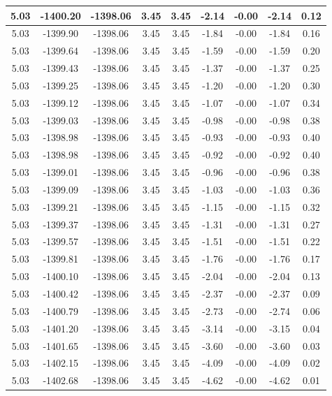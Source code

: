 \begin{table}[htbp]
\begin{adjustbox}{angle=90}
\begin{tabular}{|c|c|c|c|c|c|c|c|c|}
 5.03 & -1400.20 & -1398.06 & 3.45 & 3.45 & -2.14 & -0.00 & -2.14 & 0.12\\ \hline
 5.03 & -1399.90 & -1398.06 & 3.45 & 3.45 & -1.84 & -0.00 & -1.84 & 0.16\\ \hline
 5.03 & -1399.64 & -1398.06 & 3.45 & 3.45 & -1.59 & -0.00 & -1.59 & 0.20\\ \hline
 5.03 & -1399.43 & -1398.06 & 3.45 & 3.45 & -1.37 & -0.00 & -1.37 & 0.25\\ \hline
 5.03 & -1399.25 & -1398.06 & 3.45 & 3.45 & -1.20 & -0.00 & -1.20 & 0.30\\ \hline
 5.03 & -1399.12 & -1398.06 & 3.45 & 3.45 & -1.07 & -0.00 & -1.07 & 0.34\\ \hline
 5.03 & -1399.03 & -1398.06 & 3.45 & 3.45 & -0.98 & -0.00 & -0.98 & 0.38\\ \hline
 5.03 & -1398.98 & -1398.06 & 3.45 & 3.45 & -0.93 & -0.00 & -0.93 & 0.40\\ \hline
 5.03 & -1398.98 & -1398.06 & 3.45 & 3.45 & -0.92 & -0.00 & -0.92 & 0.40\\ \hline
 5.03 & -1399.01 & -1398.06 & 3.45 & 3.45 & -0.96 & -0.00 & -0.96 & 0.38\\ \hline
 5.03 & -1399.09 & -1398.06 & 3.45 & 3.45 & -1.03 & -0.00 & -1.03 & 0.36\\ \hline
 5.03 & -1399.21 & -1398.06 & 3.45 & 3.45 & -1.15 & -0.00 & -1.15 & 0.32\\ \hline
 5.03 & -1399.37 & -1398.06 & 3.45 & 3.45 & -1.31 & -0.00 & -1.31 & 0.27\\ \hline
 5.03 & -1399.57 & -1398.06 & 3.45 & 3.45 & -1.51 & -0.00 & -1.51 & 0.22\\ \hline
 5.03 & -1399.81 & -1398.06 & 3.45 & 3.45 & -1.76 & -0.00 & -1.76 & 0.17\\ \hline
 5.03 & -1400.10 & -1398.06 & 3.45 & 3.45 & -2.04 & -0.00 & -2.04 & 0.13\\ \hline
 5.03 & -1400.42 & -1398.06 & 3.45 & 3.45 & -2.37 & -0.00 & -2.37 & 0.09\\ \hline
 5.03 & -1400.79 & -1398.06 & 3.45 & 3.45 & -2.73 & -0.00 & -2.74 & 0.06\\ \hline
 5.03 & -1401.20 & -1398.06 & 3.45 & 3.45 & -3.14 & -0.00 & -3.15 & 0.04\\ \hline
 5.03 & -1401.65 & -1398.06 & 3.45 & 3.45 & -3.60 & -0.00 & -3.60 & 0.03\\ \hline
 5.03 & -1402.15 & -1398.06 & 3.45 & 3.45 & -4.09 & -0.00 & -4.09 & 0.02\\ \hline
 5.03 & -1402.68 & -1398.06 & 3.45 & 3.45 & -4.62 & -0.00 & -4.62 & 0.01\\ \hline

\end{tabular}
\end{adjustbox}
\end{table}

